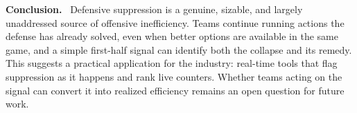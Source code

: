 \documentclass[11pt,letterpaper]{article}
\newcommand{\abssection}[1]{\textbf{#1.}~}
\begin{document}
\abssection{Conclusion}
Defensive suppression is a genuine, sizable, and largely unaddressed
source of offensive inefficiency. Teams continue running actions the
defense has already solved, even when better options are available in
the same game, and a simple first-half signal can identify both the
collapse and its remedy. This suggests a practical application for
the industry: real-time tools that flag suppression as it happens and
rank live counters. Whether teams acting on the signal can convert it
into realized efficiency remains an open question for future work.
\end{document}
